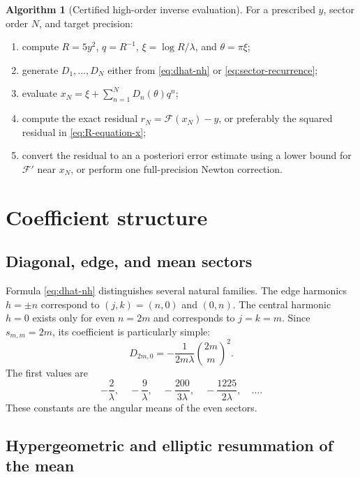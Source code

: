 \documentclass[11pt,oneside]{article}
\numberwithin{equation}{section}
\theoremstyle{plain}
\theoremstyle{definition}
\newtheorem{algorithm}[theorem]{Algorithm}
\theoremstyle{remark}
\newcommand{\Fcal}{\mathcal{F}}
\begin{document}
\begin{algorithm}[Certified high-order inverse evaluation]\label{alg:evaluate}
For a prescribed \(y\), sector order \(N\), and target precision:
\begin{enumerate}
\item compute \(R=5y^2\), \(q=R^{-1}\),
      \(\xi=\log R/\lambda\), and \(\theta=\pi\xi\);
\item generate \(D_1,\ldots,D_N\) either from
      \cref{eq:dhat-nh} or \cref{eq:sector-recurrence};
\item evaluate \(x_N=\xi+\sum_{n=1}^ND_n(\theta)q^n\);
\item compute the exact residual
      \(r_N=\Fcal(x_N)-y\), or preferably the squared residual in
      \cref{eq:R-equation-x};
\item convert the residual to an a posteriori error estimate using a lower
      bound for \(\Fcal'\) near \(x_N\), or perform one full-precision
      Newton correction.
\end{enumerate}
\end{algorithm}

\section{Coefficient structure}\label{sec:coefficient-structure}

\subsection{Diagonal, edge, and mean sectors}

Formula \cref{eq:dhat-nh} distinguishes several natural families.
The edge harmonics \(h=\pm n\) correspond to \((j,k)=(n,0)\) and
\((0,n)\).  The central harmonic \(h=0\) exists only for even \(n=2m\)
and corresponds to \(j=k=m\).  Since \(s_{m,m}=2m\), its coefficient is
particularly simple:
\begin{equation}\label{eq:central-coeff}
 \widehat D_{2m,0}
 =-\frac1{2m\lambda}\binom{2m}{m}^2.
\end{equation}
The first values are
\[
 -\frac2\lambda,
 \quad -\frac9\lambda,
 \quad -\frac{200}{3\lambda},
 \quad -\frac{1225}{2\lambda},
 \quad\ldots.
\]
These constants are the angular means of the even sectors.

\subsection{Hypergeometric and elliptic resummation of the mean}
\end{document}
